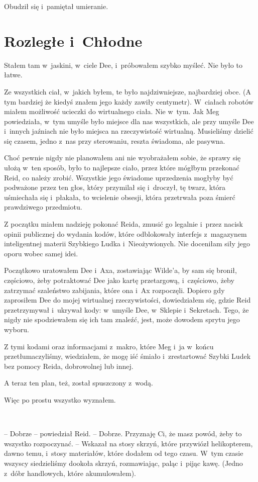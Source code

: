 \documentclass[oneside,polish,11pt,sfheadings]{mwbk}
\begin{document}
Obudził się i~pamiętał umieranie.

\chapter{Rozległe i~Chłodne}

Stałem tam w~jaskini, w~ciele Dee, i~próbowałem szybko myśleć. Nie było
to łatwe.

Ze wszystkich ciał, w~jakich byłem, te było najdziwniejsze, najbardziej
obce. (A tym bardziej że kiedyś znałem jego każdy zawiły centymetr). W~ciałach robotów miałem możliwość ucieczki do wirtualnego ciała. Nie w~tym. Jak Meg powiedziała, w~tym umyśle było miejsce dla nas wszystkich,
ale przy umyśle Dee i~innych jaźniach nie było miejsca na rzeczywistość
wirtualną. Musieliśmy dzielić się czasem, jedno z~nas przy sterowaniu,
reszta świadoma, ale pasywna.

Choć pewnie nigdy nie planowałem ani nie wyobrażałem sobie, że sprawy
się ułożą w~ten sposób, było to najlepsze ciało, przez które mógłbym
przekonać Reid, co należy zrobić. Wszystkie jego świadome uprzedzenia
mogłyby być podważone przez ten głos, który przymilał się i~droczył, tę
twarz, która uśmiechała się i~płakała, to wcielenie obsesji, która
przetrwała poza śmierć prawdziwego przedmiotu.

Z początku miałem nadzieję pokonać Reida, zmusić go legalnie i~przez
nacisk opinii publicznej do wydania kodów, które odblokowały interfejs z~magazynem inteligentnej materii Szybkiego Ludka i~Nieożywionych.
Nie doceniłam siły jego oporu wobec samej idei.

Początkowo uratowałem Dee i~Axa, zostawiając Wilde'a, by sam się bronił,
częściowo, żeby potraktować Dee jako kartę przetargową, i~częściowo,
żeby zatrzymać szaleństwo zabijania, które ona i~Ax rozpoczęli. Dopiero
gdy zaprosiłem Dee do mojej wirtualnej rzeczywistości, dowiedziałem się,
gdzie Reid przetrzymywał i~ukrywał kody: w~umyśle Dee, w~Sklepie i~Sekretach. Tego, że nigdy nie spodziewałem się ich tam znaleźć, jest,
może dowodem sprytu jego wyboru.

Z tymi kodami oraz informacjami z~makro, które Meg i~ja w~końcu
przetłumaczyliśmy, wiedziałem, że mogę iść śmiało i~zrestartować Szybki
Ludek bez pomocy Reida, dobrowolnej lub innej.

A teraz ten plan, też, został spuszczony z~wodą.

Więc po prostu wszystko wyznałem.

~

-- Dobrze -- powiedział Reid. -- Dobrze. Przyznaję Ci, że masz powód, żeby
to wszystko rozpoczynać. -- Wskazał na stosy skrzyń, które przywiózł
helikopterem, dawno temu, i~stosy materiałów, które dodałem od tego
czasu. W~tym czasie wszyscy siedzieliśmy dookoła skrzyń, rozmawiając,
paląc i~pijąc kawę. (Jedno z~dóbr handlowych, które akumulowałem).
\end{document}
